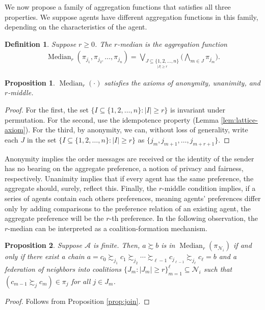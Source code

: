 \documentclass[conference]{ieeeconf}
\newcommand{\N}{\mathcal{N}}
\newcommand{\A}{\mathcal{A}}
\newcommand{\prefers}{\succsim}
\newcommand{\bigjoin}{\bigvee}
\newcommand{\bigmeet}{\bigwedge}
\renewcommand{\geq}{\geqslant}
\DeclareMathOperator{\Median}{Median}
\newtheorem{proposition}{Proposition}
\newtheorem{definition}{Definition}
\begin{document}
We now propose a family of aggregation functions that satisfies all three properties. We suppose agents have different aggregation functions in this family, depending on the characteristics of the agent.

\begin{definition}
    Suppose $r \geq 0$. The $r$-\emph{median} is the aggregation function
\begin{align}
    \Median_r\left( \pi_{j_1},\pi_{j_2,}\dots,\pi_{j_n}\right) =
    \bigjoin_{\underset{|J| \geq r }{J \subseteq \{1,2,\dots,n\}}} \biggl( \bigmeet_{m \in J} \pi_{j_m} \biggr).  \nonumber
\end{align}
\end{definition}

\begin{proposition} \label{prop:median}
    $\Median_r(\cdot)$ satisfies the axioms of anonymity, unanimity, and $r$-middle.
\end{proposition}
\begin{proof}
    For the first, the set $\{I \subseteq \{1,2,\dots,n\}: |I| \geq r\}$ is invariant under permutation. For the second, use the idempotence property (Lemma \ref{lem:lattice-axiom}).  For the third, by anonymity, we can, without loss of generality, write each $J$ in the set $\{I \subseteq \{1,2,\dots,n\}: |I| \geq r\}$ as $\{j_m,j_{m+1},\dots,j_{m+r+1}\}$.
\end{proof}

Anonymity implies the order messages are received or the identity of the sender has no bearing on the aggregate preference, a notion of privacy and fairness, respectively. Unanimity implies that if every agent has the same preference, the aggregate should, surely, reflect this. Finally, the $r$-middle condition implies, if a series of agents contain each others preferences, meaning agents' preferences differ only by adding comparisons to the preference relation of an existing agent, the aggregate preference will be the $r$-th preference. In the following observation, the $r$-median can be interpreted as a coalition-formation mechanism.

\begin{proposition} \label{prop:median-chain}
    Suppose $\A$ is finite. Then, $a \prefers b$ is in $\Median_r(\pi_{\N_i})$ if and only if there exist a chain $a = c_0 \prefers_{j_1} c_1 \prefers_{j_2} \cdots \prefers_{\ell-1} c_{j_{\ell-1}} \prefers_{j_\ell} c_{\ell} = b$
    and a federation of neighbors into coalitions $\{ J_m : |J_m| \geq r \}_{m=1}^{\ell} \subseteq \N_i$ such that $(c_{m-1} \prefers_{j} c_{m}) \in \pi_j$ for all  $j \in J_m$.
\end{proposition}
\begin{proof}
    Follows from Proposition \ref{prop:join}.
\end{proof}
\end{document}
